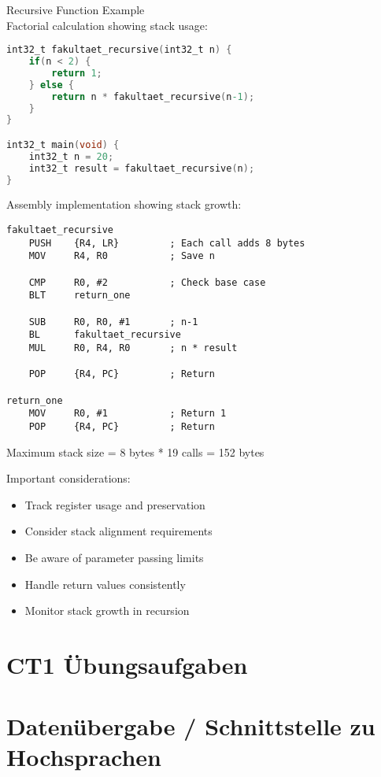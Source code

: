 \begin{example2}{Recursive Function Example}\\
Factorial calculation showing stack usage:

\begin{lstlisting}[language=C, style=basesmol]
int32_t fakultaet_recursive(int32_t n) {
    if(n < 2) {
        return 1;
    } else {
        return n * fakultaet_recursive(n-1);
    }
}

int32_t main(void) {
    int32_t n = 20;
    int32_t result = fakultaet_recursive(n);
}
\end{lstlisting}

Assembly implementation showing stack growth:
\begin{lstlisting}[language=armasm, style=basesmol]
fakultaet_recursive
    PUSH    {R4, LR}         ; Each call adds 8 bytes
    MOV     R4, R0           ; Save n
    
    CMP     R0, #2           ; Check base case
    BLT     return_one
    
    SUB     R0, R0, #1       ; n-1
    BL      fakultaet_recursive
    MUL     R0, R4, R0       ; n * result
    
    POP     {R4, PC}         ; Return
    
return_one
    MOV     R0, #1           ; Return 1
    POP     {R4, PC}         ; Return
\end{lstlisting}

Maximum stack size = 8 bytes * 19 calls = 152 bytes
\end{example2}

\begin{remark}
Important considerations:
\begin{itemize}
  \item Track register usage and preservation
  \item Consider stack alignment requirements
  \item Be aware of parameter passing limits
  \item Handle return values consistently
  \item Monitor stack growth in recursion
\end{itemize}
\end{remark}

\section*{CT1 Übungsaufgaben}
\section*{Datenübergabe / Schnittstelle zu Hochsprachen}
